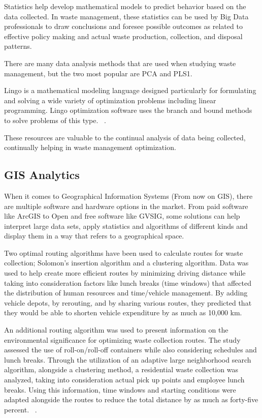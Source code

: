 \documentclass[sigconf]{acmart}
\begin{document}
Statistics help develop mathematical models to predict behavior based on the data collected.  In waste management, these statistics can be used by Big Data professionals to draw conclusions and foresee possible outcomes as related to effective policy making and actual waste production, collection, and disposal patterns. 

There are many data analysis methods that are used when studying waste management, but the two most popular are PCA and PLS1. 
~\cite{bohm2013}

Lingo is a mathematical modeling language designed particularly for formulating and solving a wide variety of optimization problems including linear programming. Lingo optimization software uses the branch and bound methods to solve problems of this type. ~\cite{akbarpour2016}.  

These resources are valuable to the continual analysis of data being collected, continually helping in waste management optimization.

\subsection{GIS Analytics}

When it comes to Geographical Information Systems (From now on GIS), there are multiple software and hardware options in the market. From paid software like ArcGIS to Open and free software like GVSIG, some solutions can help interpret large data sets, apply statistics and algorithms of different kinds and display them in a way that refers to a geographical space. %

Two optimal routing algorithms have been used to calculate routes for waste collection; Solomon's insertion algorithm and a clustering algorithm.  Data was used to help create more efficient routes by minimizing driving distance while taking into consideration factors like lunch breaks (time windows) that affected the distribution of human resources and time/vehicle management.  By adding vehicle depots, by rerouting, and by sharing various routes, they predicted that they would be able to shorten vehicle expenditure by as much as 10,000 km.  

An additional routing algorithm was used to present information on the environmental significance for optimizing waste collection routes.  The study assessed the use of roll-on/roll-off containers while also considering schedules and lunch breaks.  Through the utilization of an adaptive large neighborhood search algorithm, alongside a clustering method, a residential waste collection was analyzed, taking into consideration actual pick up points and employee lunch breaks.  Using this information, time windows and starting conditions were adapted alongside the routes to reduce the total distance by as much as forty-five percent. ~\cite{shahrokni2014big}.
\end{document}
